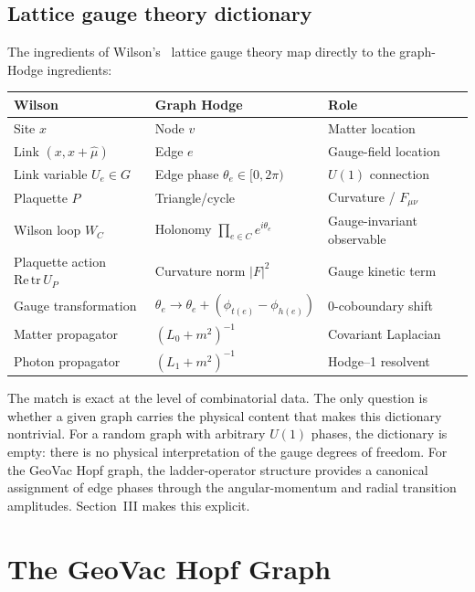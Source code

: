 \documentclass[aps,pra,twocolumn,superscriptaddress,longbibliography]{revtex4-2}
\begin{document}
\subsection{Lattice gauge theory dictionary}

The ingredients of Wilson's~\cite{Wilson1974} lattice gauge theory
map directly to the graph-Hodge ingredients:
\begin{center}
\begin{tabular}{lll}
\toprule
Wilson & Graph Hodge & Role \\
\midrule
Site $x$            & Node $v$         & Matter location \\
Link $(x, x+\hat{\mu})$ & Edge $e$     & Gauge-field location \\
Link variable $U_e \in G$ & Edge phase $\theta_e \in [0, 2\pi)$ & $U(1)$ connection \\
Plaquette $P$       & Triangle/cycle   & Curvature / $F_{\mu\nu}$ \\
Wilson loop $W_C$   & Holonomy $\prod_{e \in C} e^{i\theta_e}$ & Gauge-invariant observable \\
Plaquette action $\mathrm{Re}\,\mathrm{tr}\,U_P$ & Curvature norm $|F|^2$ & Gauge kinetic term \\
Gauge transformation & $\theta_e \to \theta_e + (\phi_{t(e)} - \phi_{h(e)})$ & 0-coboundary shift \\
Matter propagator  & $(L_0 + m^2)^{-1}$ & Covariant Laplacian \\
Photon propagator  & $(L_1 + m^2)^{-1}$ & Hodge--1 resolvent \\
\bottomrule
\end{tabular}
\end{center}

The match is exact at the level of combinatorial data.  The only
question is whether a given graph carries the physical content that
makes this dictionary nontrivial.  For a random graph with arbitrary
$U(1)$ phases, the dictionary is empty: there is no physical
interpretation of the gauge degrees of freedom.  For the GeoVac Hopf
graph, the ladder-operator structure provides a canonical assignment
of edge phases through the angular-momentum and radial transition
amplitudes.  Section~III makes this explicit.


\section{The GeoVac Hopf Graph}
\label{sec:hopfgraph}
\end{document}
